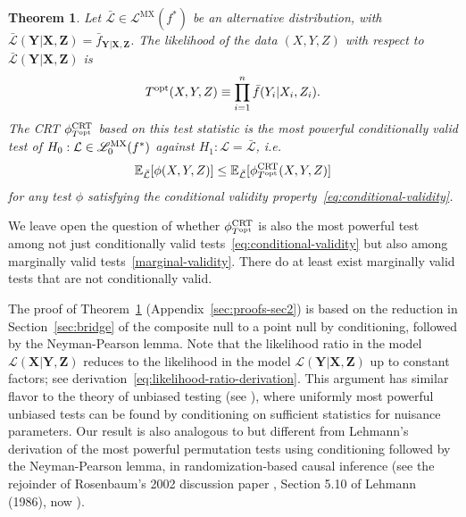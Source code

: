 \documentclass[ejs]{imsart}
\numberwithin{equation}{section}
\theoremstyle{plain}
\newtheorem{theorem}{Theorem}[section]
\theoremstyle{definition}
\theoremstyle{remark}
\newcommand{\prx}{\bm X}
\newcommand{\srx}{X}
\newcommand{\prz}{\bm Z}
\newcommand{\srz}{Z}
\newcommand{\pry}{{\bm Y}}
\newcommand{\sry}{Y}
\def\CRT{\textnormal{CRT}}
\begin{document}
\begin{theorem} \label{prop:crt-optimality}
	Let $\bar{\mathcal L} \in \mathscr L^{\text{MX}}(f^*)$ be an alternative distribution, with $\bar{\mathcal L}(\pry|\prx,\prz) = \bar f_{\pry|\prx,\prz}$. The likelihood of the data $(\srx, \sry, \srz)$ with respect to $\bar{\mathcal L}(\pry|\prx,\prz)$ is
	\begin{equation}
	T^{\textnormal{opt}}(\srx, \sry, \srz) \equiv \prod_{i = 1}^n  \bar f(\sry_i|\srx_i, \srz_i).
	\label{log-likelihood-ratio}
	\end{equation}
	The CRT $\phi^{\CRT}_{T^{\textnormal{opt}}}$ based on this test statistic is the most powerful conditionally valid test of $H_0: \mathcal L \in \mathscr L_0^{\textnormal{MX}}(f^*)$ against $H_1: \mathcal L = \bar{\mathcal L}$, i.e. 
	\begin{equation}
	\mathbb E_{\bar{\mathcal L}}[\phi(\srx,\sry,\srz)] \leq \mathbb E_{\bar{\mathcal L}}[\phi^{\CRT}_{T^\textnormal{opt}}(\srx, \sry, \srz)]
	\label{unconditional}
	\end{equation}
	for any test $\phi$ satisfying the conditional validity property~\eqref{eq:conditional-validity}.
\end{theorem}

We leave open the question of whether $\phi^{\CRT}_{T^\textnormal{opt}}$ is also the most powerful test among not just conditionally valid tests~\eqref{eq:conditional-validity} but also among marginally valid tests~\eqref{marginal-validity}. There do at least exist marginally valid tests that are not conditionally valid.

The proof of Theorem~\ref{prop:crt-optimality} (Appendix~\ref{sec:proofs-sec2}) is based on the reduction in Section~\ref{sec:bridge} of the composite null to a point null by conditioning, followed by the Neyman-Pearson lemma. Note that the likelihood ratio in the model $\mathcal L(\prx|\pry, \prz)$ reduces to the likelihood in the model $\mathcal L(\pry|\prx, \prz)$ up to constant factors; see derivation~\eqref{eq:likelihood-ratio-derivation}. This argument has similar flavor to the theory of unbiased testing (see \citet[Chapter 4]{TSH}), where uniformly most powerful unbiased tests can be found by conditioning on sufficient statistics for nuisance parameters. Our result is also analogous to but different from Lehmann's derivation of the most powerful permutation tests using conditioning followed by the Neyman-Pearson lemma, in randomization-based causal inference (see the rejoinder of Rosenbaum's 2002 discussion paper \citep{Rosenbaum2002}, Section 5.10 of Lehmann (1986), now \citet[Section 5.9]{TSH}).
\end{document}
